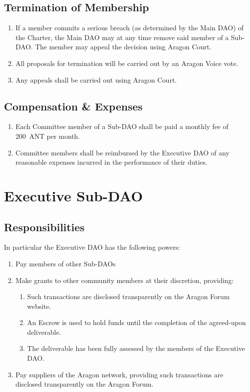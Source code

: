 \subsection{Termination of Membership}

\begin{enumerate}
	\item If a member commits a serious breach (as determined by the Main \ac{DAO}) of the Charter, the Main \ac{DAO} may at any time remove said member of a Sub-\ac{DAO}.
	The member may appeal the decision using Aragon Court.
	\item All proposals for termination will be carried out by an Aragon Voice vote.
	\item Any appeals shall be carried out using Aragon Court.
\end{enumerate}


\subsection{Compensation \& Expenses}

\begin{enumerate}
	\item Each Committee member of a Sub-\ac{DAO} shall be paid a monthly fee of 200~\ac{ANT} per month.
	\item Committee members shall be reimbursed by the Executive \ac{DAO} of any reasonable expenses incurred in the performance of their duties.
\end{enumerate}


\section{Executive Sub-DAO}

\subsection{Responsibilities}

In particular the Executive \ac{DAO} has the following powers:
\begin{enumerate}
	\item Pay members of other Sub-\acp{DAO}
	\item Make grants to other community members at their discretion, providing:
	\begin{enumerate}
		\item Such transactions are disclosed transparently on the Aragon Forum website.
		\item An Escrow is used to hold funds until the completion of the agreed-upon deliverable.
		\item The deliverable has been fully assessed by the members of the Executive \ac{DAO}.
	\end{enumerate}
	\item Pay suppliers of the Aragon network, providing such transactions are disclosed transparently on the Aragon Forum.
\end{enumerate}

